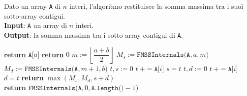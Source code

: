 \documentclass[14pt]{extreport}
\theoremstyle{definition}
\theoremstyle{definition}
\begin{document}
\begin{algorithm}[H]
    \caption{
        Dato un array \texttt{A} di $n$ interi, l'algoritmo restituisce la somma massima tra i suoi sotto-array contigui.\\
        \textbf{Input}: \texttt{A} un array di $n$ interi.\\
        \textbf{Output}: la somma massima tra i sotto-array contigui di \texttt{A}.
    }

    \begin{algorithmic}[1]
                    \State \textbf{return} $\texttt{A[}a\texttt{]}$
                \Else
                    \State \textbf{return} $0$
                \EndIf
            \Else
                \State $m := \left \lfloor \dfrac{a + b}{2} \right \rfloor$
                \State $M_s := \texttt{FMSSInternals(A}, a, m\texttt{)}$
                \State $M_d := \texttt{FMSSInternals(A}, m +1, b\texttt{)}$
                \State $t, s := 0$
                 
                    \State $t \ += \texttt{A[}i\texttt{]}$
                        \State $s = t$
                    \EndIf
                \EndFor
                \State $t, d := 0$
                 
                    \State $t \ += \texttt{A[}i\texttt{]}$
                        \State $d = t$
                    \EndIf
                \EndFor
                \State \textbf{return} $\max(M_s, M_d, s + d)$
            \EndIf
        \EndFunction
        \\
            \State \textbf{return} $\texttt{FMSSInternals(A}, 0, \texttt{A.length()} - 1 \texttt{)}$ 
        \EndFunction
    \end{algorithmic}
\end{algorithm}
\end{document}
